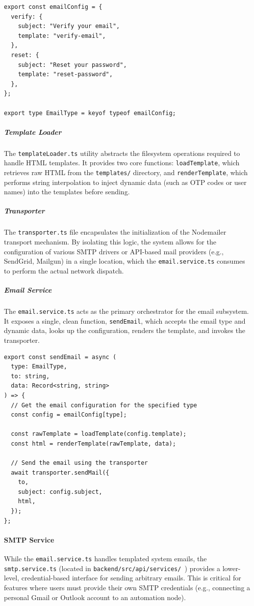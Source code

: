 \begin{lstlisting}[caption={Email configuration registry (\texttt{email.config.ts})}]
export const emailConfig = {
  verify: {
    subject: "Verify your email",
    template: "verify-email",
  },
  reset: {
    subject: "Reset your password",
    template: "reset-password",
  },
};

export type EmailType = keyof typeof emailConfig;
\end{lstlisting}

\subparagraph{Template Loader}
The \texttt{templateLoader.ts} utility abstracts the filesystem operations required to handle HTML templates. It provides two core functions: \texttt{loadTemplate}, which retrieves raw HTML from the \texttt{templates/} directory, and \texttt{renderTemplate}, which performs string interpolation to inject dynamic data (such as OTP codes or user names) into the templates before sending.

\subparagraph{Transporter}
The \texttt{transporter.ts} file encapsulates the initialization of the Nodemailer transport mechanism. By isolating this logic, the system allows for the configuration of various SMTP drivers or API-based mail providers (e.g., SendGrid, Mailgun) in a single location, which the \texttt{email.service.ts} consumes to perform the actual network dispatch.

\subparagraph{Email Service}
The \texttt{email.service.ts} acts as the primary orchestrator for the email subsystem. It exposes a single, clean function, \texttt{sendEmail}, which accepts the email type and dynamic data, looks up the configuration, renders the template, and invokes the transporter.

\begin{lstlisting}[caption={Email service orchestration (\texttt{email.service.ts})}]
export const sendEmail = async (
  type: EmailType,
  to: string,
  data: Record<string, string>
) => {
  // Get the email configuration for the specified type
  const config = emailConfig[type];

  const rawTemplate = loadTemplate(config.template);
  const html = renderTemplate(rawTemplate, data);

  // Send the email using the transporter
  await transporter.sendMail({
    to,
    subject: config.subject,
    html,
  });
};
\end{lstlisting}

\paragraph{SMTP Service}
While the \seqsplit\texttt{{email.service.ts}} handles templated system emails, the \seqsplit\texttt{{smtp.service.ts}} (located in {\seqsplit\texttt{backend/src/api/services/ }}) provides a lower-level, credential-based interface for sending arbitrary emails. This is critical for features where users must provide their own SMTP credentials (e.g., connecting a personal Gmail or Outlook account to an automation node).

